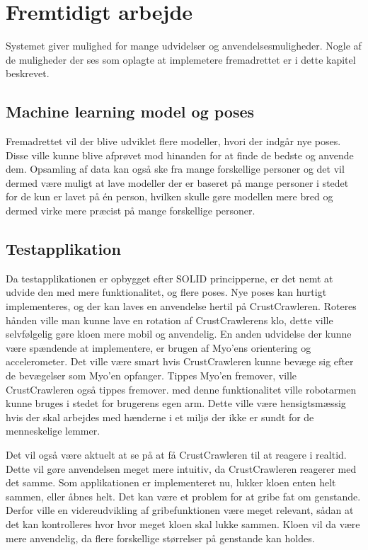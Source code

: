 \thispagestyle{fancy}
\chapter{Fremtidigt arbejde}
\label{chp:fremtidigtarbejde}
Systemet giver mulighed for mange udvidelser og anvendelsesmuligheder. Nogle af de muligheder der ses som oplagte at implemetere fremadrettet er i dette kapitel beskrevet.

\section{Machine learning model og poses}
Fremadrettet vil der blive udviklet flere modeller, hvori der indgår nye poses. Disse ville kunne blive afprøvet mod hinanden for at finde de bedste og anvende dem. Opsamling af data kan også ske fra mange forskellige personer og det vil dermed være muligt at lave modeller der er baseret på mange personer i stedet for de kun er lavet på én person, hvilken skulle gøre modellen mere bred og dermed virke mere præcist på mange forskellige personer.

\section{Testapplikation}
Da testapplikationen er opbygget efter SOLID principperne\citep{RefWorks:10}, er det nemt at udvide den med mere funktionalitet, og flere poses. Nye poses kan hurtigt implementeres, og der kan laves en anvendelse hertil på CrustCrawleren. Roteres hånden ville man kunne lave en rotation af CrustCrawlerens klo, dette ville selvfølgelig gøre kloen mere mobil og anvendelig. En anden udvidelse der kunne være spændende at implementere, er brugen af Myo'ens orientering og accelerometer. Det ville være smart hvis CrustCrawleren kunne bevæge sig efter de bevægelser som Myo'en opfanger. Tippes Myo'en fremover, ville CrustCrawleren også tippes fremover. med denne funktionalitet ville robotarmen kunne bruges i stedet for brugerens egen arm. Dette ville være hensigtsmæssig hvis der skal arbejdes med hænderne i et miljø der ikke er sundt for de menneskelige lemmer.

Det vil også være aktuelt at se på at få CrustCrawleren til at reagere i realtid. Dette vil gøre anvendelsen meget mere intuitiv, da CrustCrawleren reagerer med det samme. Som applikationen er implementeret nu, lukker kloen enten helt sammen, eller åbnes helt. Det kan være et problem for at gribe fat om genstande. Derfor ville en videreudvikling af gribefunktionen være meget relevant, sådan at det kan kontrolleres hvor hvor meget kloen skal lukke sammen. Kloen vil da være mere anvendelig, da flere forskellige størrelser på genstande kan holdes.

